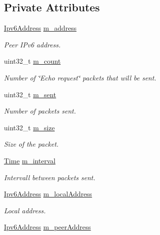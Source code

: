 \subsection*{Private Attributes}
\begin{DoxyCompactItemize}
\item 
\hyperlink{classns3_1_1Ipv6Address}{Ipv6\+Address} \hyperlink{classns3_1_1Ping6_a90705c6c52b848a90e920a6a3e53c64c}{m\+\_\+address}
\begin{DoxyCompactList}\small\item\em Peer I\+Pv6 address. \end{DoxyCompactList}\item 
uint32\+\_\+t \hyperlink{classns3_1_1Ping6_a7a42b5561b73f3923bee2dcc204e5667}{m\+\_\+count}
\begin{DoxyCompactList}\small\item\em Number of \char`\"{}\+Echo request\char`\"{} packets that will be sent. \end{DoxyCompactList}\item 
uint32\+\_\+t \hyperlink{classns3_1_1Ping6_abbf4b7aed35f816690838a13e533ea9f}{m\+\_\+sent}
\begin{DoxyCompactList}\small\item\em Number of packets sent. \end{DoxyCompactList}\item 
uint32\+\_\+t \hyperlink{classns3_1_1Ping6_ad39776241ec4bf07226382aeeb53924a}{m\+\_\+size}
\begin{DoxyCompactList}\small\item\em Size of the packet. \end{DoxyCompactList}\item 
\hyperlink{classns3_1_1Time}{Time} \hyperlink{classns3_1_1Ping6_a9cc64d279cdfae296f88bce219af3c72}{m\+\_\+interval}
\begin{DoxyCompactList}\small\item\em Intervall between packets sent. \end{DoxyCompactList}\item 
\hyperlink{classns3_1_1Ipv6Address}{Ipv6\+Address} \hyperlink{classns3_1_1Ping6_a3d25a5fb60b248d4ad776a97f17cc0d4}{m\+\_\+local\+Address}
\begin{DoxyCompactList}\small\item\em Local address. \end{DoxyCompactList}\item 
\hyperlink{classns3_1_1Ipv6Address}{Ipv6\+Address} \hyperlink{classns3_1_1Ping6_ad0b9bf2e656c09ab204d51d0a04e4b25}{m\+\_\+peer\+Address}

\end{DoxyCompactItemize}
